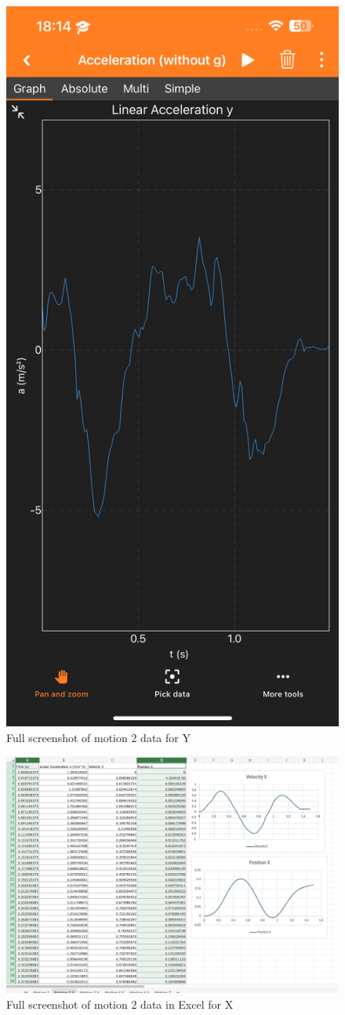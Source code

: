 \documentclass[idxtotoc,hyperref,openany]{labbook} %
\begin{document}
\begin{figure}[H] %
\begin{center}
\includegraphics[width=.55\linewidth]{images/Lab.03/Lab03Motion2Y.PNG}
\end{center}
\caption{Full screenshot of motion 2 data for Y}
\label{fig:Lab03-Motion2-Y}
\end{figure}

\begin{figure}[H] %
\begin{center}
\includegraphics[width=1.3\linewidth]{images/Lab.03/Lab03MotionXExcel.png}
\end{center}
\caption{Full screenshot of motion 2 data in Excel for X}
\label{fig:Lab03-Motion2-Excel-X}
\end{figure}
\end{document}
